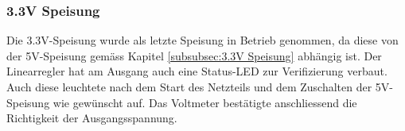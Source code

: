 \subsubsection{3.3V Speisung}
\label{subsubsec:Inbetriebnahme_3.3V_Speisungen}

Die 3.3V-Speisung wurde als letzte Speisung in Betrieb genommen, da diese von der 5V-Speisung gemäss Kapitel \ref{subsubsec:3.3V Speisung} abhängig ist. Der Linearregler hat am Ausgang auch eine Status-LED zur Verifizierung verbaut. Auch diese leuchtete nach dem Start des Netzteils und dem Zuschalten der 5V-Speisung wie gewünscht auf. Das Voltmeter bestätigte anschliessend die Richtigkeit der Ausgangsspannung.